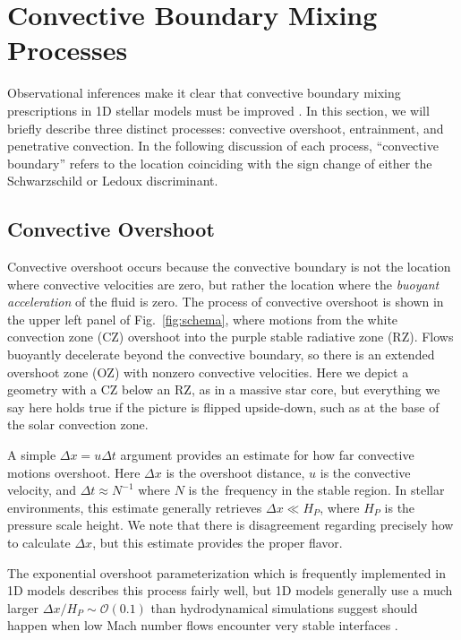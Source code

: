 \section{Convective Boundary Mixing Processes}
\label{sec:processes}

Observational inferences make it clear that convective boundary mixing prescriptions in 1D stellar models must be improved \citep{pinsonneault_1997, claret_torres_2018, pedersen_etal_2021}.
In this section, we will briefly describe three distinct processes: convective overshoot, entrainment, and penetrative convection.
In the following discussion of each process, ``convective boundary'' refers to the location coinciding with the sign change of either the Schwarzschild or Ledoux discriminant.

\subsection{Convective Overshoot}
Convective overshoot occurs because the convective boundary is not the location where convective velocities are zero, but rather the location where the \emph{buoyant acceleration} of the fluid is zero.
The process of convective overshoot is shown in the upper left panel of Fig.~\ref{fig:schema}, where motions from the white convection zone (CZ) overshoot into the purple stable radiative zone (RZ).
Flows buoyantly decelerate beyond the convective boundary, so there is an extended overshoot zone (OZ) with nonzero convective velocities.
Here we depict a geometry with a CZ below an RZ, as in a massive star core, but everything we say here holds true if the picture is flipped upside-down, such as at the base of the solar convection zone.

A simple $\Delta x = u \Delta t$ argument provides an estimate for how far convective motions overshoot.
Here $\Delta x$ is the overshoot distance, $u$ is the convective velocity, and $\Delta t \approx N^{-1}$ where $N$ is the \brunt$\,$frequency in the stable region.
In stellar environments, this estimate generally retrieves $\Delta x \ll H_P$, where $H_P$ is the pressure scale height.
We note that there is disagreement regarding precisely how to calculate $\Delta x$, but this estimate provides the proper flavor.

The exponential overshoot parameterization \citep[per e.g.,][]{herwig_2000} which is frequently implemented in 1D models describes this process fairly well, but 1D models generally use a much larger $\Delta x/H_P \sim \mathcal{O}(0.1)$ than hydrodynamical simulations suggest should happen when low Mach number flows encounter very stable interfaces \citep{korre_etal_2019}.

